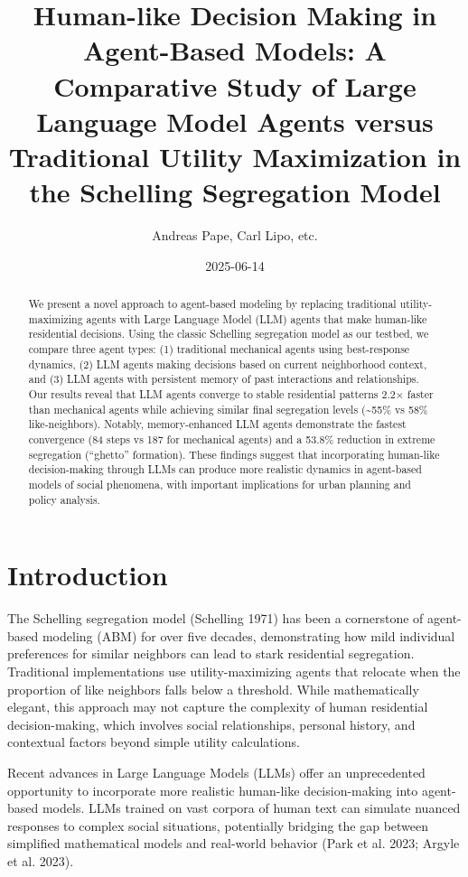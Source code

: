 \documentclass[
  11pt,
]{article}
\title{Human-like Decision Making in Agent-Based Models: A Comparative
Study of Large Language Model Agents versus Traditional Utility
Maximization in the Schelling Segregation Model}
\author{Andreas Pape, Carl Lipo, etc.}
\date{2025-06-14}
\begin{document}
\maketitle
\begin{abstract}
We present a novel approach to agent-based modeling by replacing
traditional utility-maximizing agents with Large Language Model (LLM)
agents that make human-like residential decisions. Using the classic
Schelling segregation model as our testbed, we compare three agent
types: (1) traditional mechanical agents using best-response dynamics,
(2) LLM agents making decisions based on current neighborhood context,
and (3) LLM agents with persistent memory of past interactions and
relationships. Our results reveal that LLM agents converge to stable
residential patterns 2.2× faster than mechanical agents while achieving
similar final segregation levels (\textasciitilde55\% vs 58\%
like-neighbors). Notably, memory-enhanced LLM agents demonstrate the
fastest convergence (84 steps vs 187 for mechanical agents) and a 53.8\%
reduction in extreme segregation (``ghetto'' formation). These findings
suggest that incorporating human-like decision-making through LLMs can
produce more realistic dynamics in agent-based models of social
phenomena, with important implications for urban planning and policy
analysis.
\end{abstract}


\section{Introduction}\label{introduction}

The Schelling segregation model (Schelling 1971) has been a cornerstone
of agent-based modeling (ABM) for over five decades, demonstrating how
mild individual preferences for similar neighbors can lead to stark
residential segregation. Traditional implementations use
utility-maximizing agents that relocate when the proportion of like
neighbors falls below a threshold. While mathematically elegant, this
approach may not capture the complexity of human residential
decision-making, which involves social relationships, personal history,
and contextual factors beyond simple utility calculations.

Recent advances in Large Language Models (LLMs) offer an unprecedented
opportunity to incorporate more realistic human-like decision-making
into agent-based models. LLMs trained on vast corpora of human text can
simulate nuanced responses to complex social situations, potentially
bridging the gap between simplified mathematical models and real-world
behavior (Park et al. 2023; Argyle et al. 2023).
\end{document}
